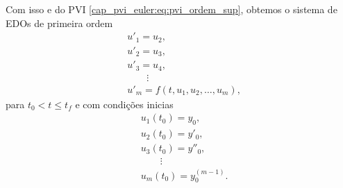 Com isso e do PVI \eqref{cap_pvi_euler:eq:pvi_ordem_sup}, obtemos o sistema de EDOs de primeira ordem
\begin{subequations}
  \begin{align}
    &u'_1 = u_2,\\
    &u'_2 = u_3,\\
    &u'_3 = u_4,\\
    &\qquad\vdots\\
    &u'_{m} = f(t, u_1, u_2, \dotsc, u_{m}),
  \end{align}
\end{subequations}
para $t_0 < t \leq t_f$ e com condições inicias
\begin{subequations}
  \begin{align}
    &u_1(t_0) = y_0,\\
    &u_2(t_0) = y'_0,\\
    &u_3(t_0) = y''_0,\\
    &\qquad\vdots\\
    &u_{m}(t_0) = y^{(m-1)}_0.
  \end{align}
\end{subequations}

